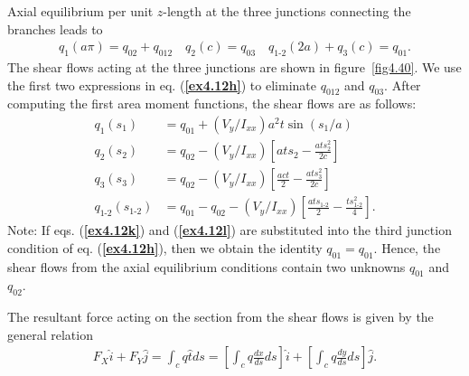 \documentclass{AeroStructure-ERJohnson}
\begin{document}
\begin{example}
\noindent Axial equilibrium per unit $z$-length at the three junctions connecting the branches leads to
\begin{align}\label{ex4.12h}
q_{1}(a \pi)=q_{02}+q_{012} \quad q_{2}(c)=q_{03} \quad q_{\textrm{1-2}}(2 a)+q_{3}(c)=q_{01}.
\end{align}
The shear flows acting at the three junctions are shown in figure~\ref{fig4.40}. We use the first two expressions in eq. (\textbf{\ref{ex4.12h}}) to eliminate $q_{012}$ and $q_{03}$. After computing the first area moment functions, the shear flows are as follows:
\begin{align}
q_{1}\left(s_{1}\right)&=q_{01}+\left(V_{y}/I_{x x}\right) a^{2} t \sin \left(s_{1}/a\right)\label{ex4.12i}\\
q_{2}\left(s_{2}\right)&=q_{02}-\left(V_{y}/I_{x x}\right)\left[a t s_{2}-\frac{a t s_{2}^{2}}{2 c}\right]\label{ex4.12j} \\
q_{3}\left(s_{3}\right)&=q_{02}-\left(V_{y}/I_{x x}\right)\left[\frac{a c t}{2}-\frac{a t s_{3}^{2}}{2 c}\right]\label{ex4.12k}\\
q_{\textrm{1-2}}\left(s_{\textrm{1-2}}\right)&=q_{01}-q_{02}-\left(V_{y}/I_{x x}\right)\left[\frac{a t s_{\textrm{1-2}}}{2}-\frac{t s_{\textrm{1-2}}^{2}}{4}\right].\label{ex4.12l}
\end{align}
Note: If eqs. (\textbf{\ref{ex4.12k}}) and (\textbf{\ref{ex4.12l}}) are substituted into the third junction condition of eq. (\textbf{\ref{ex4.12h}}), then we obtain the identity $q_{01}=q_{01}$. Hence, the shear flows from the axial equilibrium conditions contain two unknowns $q_{01}$ and $q_{02}$.

The resultant force acting on the section from the shear flows is given by the general relation
\begin{align}\label{ex4.12m}
F_{X} \hat{i}+F_{Y} \hat{j}=\int_{c} q \hat{t} d s=\left[\int_{c} q \frac{d x}{d s} d s\right] \hat{i}
+\left[\int_{c} q \frac{d y}{d s} d s\right]\hat{j}.
\end{align}
\vspace*{5pt}
\clearpage


\end{example}
\end{document}
